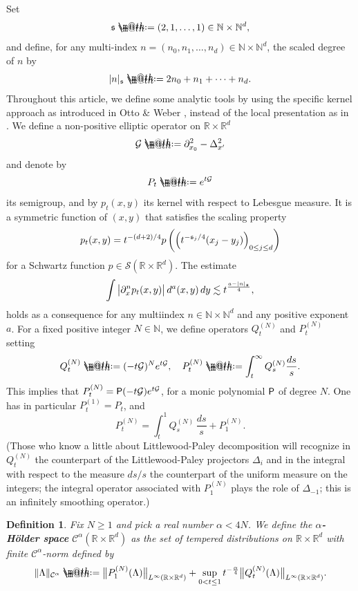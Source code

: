 \documentclass[10pt, reqno]{amsart}
\makeatletter
\numberwithin{subsection}{section}
\numberwithin{subsubsection}{subsection}
\numberwithin{equation}{section} %
\theoremstyle{mystyle}
\theoremstyle{mystyle2}
\newtheorem*{defn*} {Definition}
\theoremstyle{mystyle3}
\newcommand{\ssk}{\smallskip}
\newcommand\bbN{\mathbb{N}}
\newcommand\bbR{\mathbb{R}}
\newcommand{\mcC}{\mathcal{C}}
\newcommand{\mcG}{\mathcal{G}}
\newcommand\mcS{\mathcal{S}}
\newcommand*{\defeq}{\mathrel{\rlap{%
                     \raisebox{0.3ex}{$\m@th\cdot$}}%
                     \raisebox{-0.3ex}{$\m@th\cdot$}}%
                     =}
\makeatother
\begin{document}
Set
$$
\frak{s} \defeq  (2,1,\dots,1)\in\bbN\times\bbN^d,
$$
and define, for any multi-index $n=(n_0,n_1,\dots,n_d)\in\bbN\times\bbN^d$, the scaled degree of $n$ by 
$$
|n|_{\frak{s}} \defeq  2n_0+n_1+\cdots+n_d.
$$ 
Throughout this article, we define some analytic tools by using the specific kernel approach as introduced in Otto \& Weber \cite{OttoWeber}, instead of the local presentation as in \cite{Hai14}. We define a non-positive elliptic operator on $\bbR\times\bbR^d$
$$
\mcG \defeq  \partial_{x_0}^2 - \Delta_{x'}^2
$$
and denote by 
$$
P_t \defeq  e^{t\mcG}
$$ 
its semigroup, and by $p_t(x,y)$ its kernel with respect to Lebesgue 
measure. It is a symmetric function of $(x,y)$ that satisfies the scaling 
property
$$
p_t(x,y) = t^{-(d+2)/4}p\left(\Big(t^{-\frak{s}_j/4}(x_j-y_j)\Big)_{0\leq j\leq d}\right)
$$
for a Schwartz function $p\in\mcS(\bbR\times\bbR^d)$. The estimate
\begin{equation} \label{EqMomentEstimate} 
\int \big\vert \partial^n_x p_t(x,y) \big\vert \, d^a(x,y)\,dy \lesssim t^{\frac{a-\vert n\vert_{\frak{s}}}{4}},
\end{equation}
holds as a consequence for any multiindex $n\in\bbN\times\bbN^d$ and any positive exponent $a$. For a fixed positive integer $N\in\bbN$, we define operators $Q_t^{(N)}$ and $P_t^{(N)}$ setting
$$
Q_t^{(N)} \defeq  (-t\mcG)^N e^{t\mcG},\quad 
P_t^{(N)}\defeq  \int_t^\infty Q_s^{(N)} \frac{ds}s.
$$ 
This implies that $P_t^{(N)} = {\sf P}(-t\mcG) e^{t\mcG}$, for a monic polynomial ${\sf P}$ of degree $N$. One has in particular $P_t^{(1)}=P_t$, and
\begin{equation} \label{EqContinuousLPDecomposition}
P_t^{(N)} = \int_t^1 Q_s^{(N)}\,\frac{ds}{s} + P_1^{(N)}.
\end{equation}
(Those who know a little about Littlewood-Paley decomposition will recognize in $Q_t^{(N)}$ the counterpart of the Littlewood-Paley projectors $\Delta_i$ and in the integral with respect to the measure $ds/s$ the counterpart of the uniform measure on the integers; the integral operator associated with $P_1^{(N)}$ plays the role of $\Delta_{-1}$; this is an infinitely smoothing operator.) 

\ssk

\begin{defn*}
Fix $N\geq 1$ and pick a real number $\alpha < 4N$. We define the \textbf{\textsf{$\alpha$-H\"older space}} $\mcC^\alpha(\bbR\times\bbR^d)$ as the 
set of tempered distributions on $\bbR\times\bbR^d$ with finite $\mcC^\alpha$-norm 
defined by 
\begin{equation} \label{EqDefnHolderNorm}
\|\Lambda\|_{\mcC^\alpha} \defeq  \big\|P_1^{(N)}(\Lambda)\big\|_{L^\infty(\bbR\times\bbR^d)} + \underset{0<t\leq 1}{\sup}\,t^{-\frac{\alpha}{4}}\big\|Q_t^{(N)}(\Lambda)\big\|_{L^\infty(\bbR\times\bbR^d)}.
\end{equation}
\end{defn*}
\end{document}
